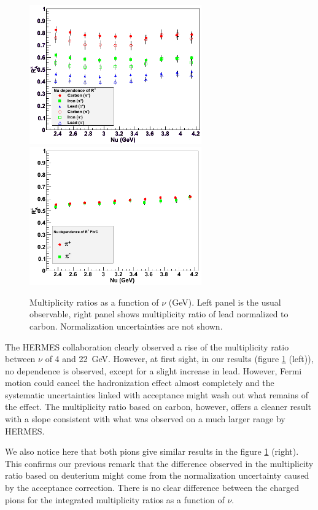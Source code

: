 \begin{figure}[tbp]
\centering
\includegraphics[width=7.4cm] {chap6-fig/F_RvNu.png} 
\includegraphics[width=7.4cm] {chap6-fig/F_RvNu_PbC.png} 
\caption{Multiplicity ratios as a function of $\nu$ (GeV). Left panel is the usual 
observable, right panel shows multiplicity ratio of lead normalized to carbon. 
Normalization uncertainties are not shown.}
\label{fig:RNu}
\end{figure}

The HERMES collaboration clearly observed a rise of the multiplicity ratio 
between $\nu$ of 4 and 22~GeV. However, at first sight, in our results (figure 
\ref{fig:RNu} (left)), no dependence is observed, except for a 
slight increase in lead.
However, Fermi motion could cancel the hadronization effect almost completely and the
systematic uncertainties linked with acceptance might wash out what remains of the effect. The 
multiplicity ratio based on carbon, however, offers a cleaner result with a slope consistent 
with what was observed on a much larger range by HERMES.

We also notice here that both pions give similar results in the figure 
\ref{fig:RNu} (right). This confirms our previous remark that the difference 
observed in the multiplicity ratio based on deuterium might come from the 
normalization uncertainty caused by the acceptance correction. There is no 
clear difference between the charged pions for the integrated multiplicity 
ratios as a function of $\nu$.

